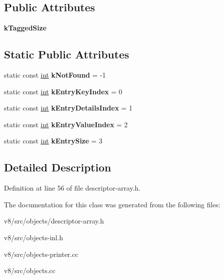 \subsection*{Public Attributes}
\begin{DoxyCompactItemize}
\item 
\mbox{\label{classv8_1_1internal_1_1DescriptorArray_a861d94ee6a42c44f69340ac856bef63c}} 
{\bfseries k\+Tagged\+Size}
\end{DoxyCompactItemize}
\subsection*{Static Public Attributes}
\begin{DoxyCompactItemize}
\item 
\mbox{\label{classv8_1_1internal_1_1DescriptorArray_a616314d46969c56bb8a8586f97173624}} 
static const \mbox{\hyperlink{classint}{int}} {\bfseries k\+Not\+Found} = -\/1
\item 
\mbox{\label{classv8_1_1internal_1_1DescriptorArray_a38dd8439b86b71b2329a4e5ba7300d2d}} 
static const \mbox{\hyperlink{classint}{int}} {\bfseries k\+Entry\+Key\+Index} = 0
\item 
\mbox{\label{classv8_1_1internal_1_1DescriptorArray_ab8efa484ac48cfef9c8c4dec415c021c}} 
static const \mbox{\hyperlink{classint}{int}} {\bfseries k\+Entry\+Details\+Index} = 1
\item 
\mbox{\label{classv8_1_1internal_1_1DescriptorArray_a3491a1ef1b0a49aa602fe524a2236ef7}} 
static const \mbox{\hyperlink{classint}{int}} {\bfseries k\+Entry\+Value\+Index} = 2
\item 
\mbox{\label{classv8_1_1internal_1_1DescriptorArray_aac62cc696b7db0a2f97749cc01fc00bc}} 
static const \mbox{\hyperlink{classint}{int}} {\bfseries k\+Entry\+Size} = 3
\end{DoxyCompactItemize}


\subsection{Detailed Description}


Definition at line 56 of file descriptor-\/array.\+h.



The documentation for this class was generated from the following files\+:\begin{DoxyCompactItemize}
\item 
v8/src/objects/descriptor-\/array.\+h\item 
v8/src/objects-\/inl.\+h\item 
v8/src/objects-\/printer.\+cc\item 
v8/src/objects.\+cc\end{DoxyCompactItemize}
